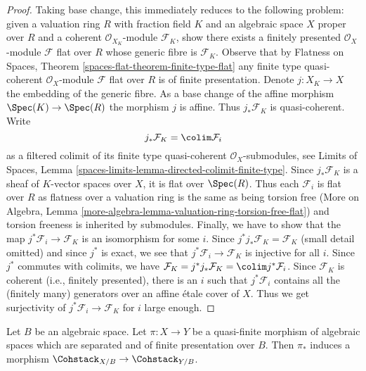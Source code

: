 \begin{proof}
Taking base change, this immediately reduces to the following
problem: given a valuation ring $R$ with fraction field $K$ and
an algebraic space $X$ proper over $R$ and a coherent
$\mathcal{O}_{X_K}$-module $\mathcal{F}_K$, show there exists
a finitely presented $\mathcal{O}_X$-module $\mathcal{F}$
flat over $R$ whose generic fibre is $\mathcal{F}_K$.
Observe that by Flatness on Spaces, Theorem
\ref{spaces-flat-theorem-finite-type-flat}
any finite type quasi-coherent $\mathcal{O}_X$-module
$\mathcal{F}$ flat over $R$ is of finite presentation.
Denote $j : X_K \to X$ the embedding of the generic fibre.
As a base change of the affine morphism $\Spec(K) \to \Spec(R)$
the morphism $j$ is affine. Thus $j_*\mathcal{F}_K$ is
quasi-coherent. Write
$$
j_*\mathcal{F}_K = \colim \mathcal{F}_i
$$
as a filtered colimit of its finite type quasi-coherent
$\mathcal{O}_X$-submodules, see
Limits of Spaces, Lemma \ref{spaces-limits-lemma-directed-colimit-finite-type}.
Since $j_*\mathcal{F}_K$ is a sheaf of $K$-vector spaces over $X$,
it is flat over $\Spec(R)$. Thus each $\mathcal{F}_i$ is flat
over $R$ as flatness over a valuation ring is the same as being
torsion free
(More on Algebra, Lemma
\ref{more-algebra-lemma-valuation-ring-torsion-free-flat})
and torsion freeness is inherited by submodules.
Finally, we have to show that the map
$j^*\mathcal{F}_i \to \mathcal{F}_K$
is an isomorphism for some $i$.
Since $j^*j_*\mathcal{F}_K = \mathcal{F}_K$ (small detail omitted)
and since $j^*$ is exact, we see that $j^*\mathcal{F}_i \to \mathcal{F}_K$
is injective for all $i$.
Since $j^*$ commutes with colimits, we have
$\mathcal{F}_K = j^*j_*\mathcal{F}_K = \colim j^*\mathcal{F}_i$.
Since $\mathcal{F}_K$ is coherent (i.e., finitely presented),
there is an $i$ such that $j^*\mathcal{F}_i$ contains all the
(finitely many) generators over an affine \'etale cover of $X$.
Thus we get surjectivity of $j^*\mathcal{F}_i \to \mathcal{F}_K$
for $i$ large enough.
\end{proof}

\begin{lemma}
\label{lemma-coherent-functorial}
Let $B$ be an algebraic space. Let $\pi : X \to Y$ be a quasi-finite
morphism of algebraic spaces which are separated and of finite presentation
over $B$. Then $\pi_*$ induces a morphism
$\Cohstack_{X/B} \to \Cohstack_{Y/B}$.
\end{lemma}

